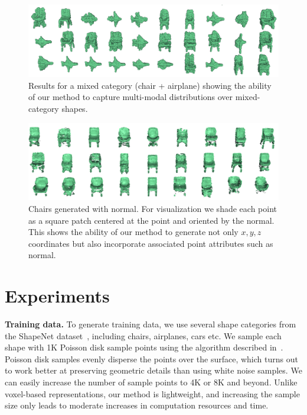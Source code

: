 \begin{figure}[t]
\includegraphics[width=1.0\linewidth]{PCAGAN/images/gallery/chairs_airplane.png}
\vspace{-16pt}
\caption{\small \label{fig:mixed} Results for a mixed category (chair + airplane) showing the ability of our method to capture multi-modal distributions over mixed-category shapes.}
\vspace{-6pt}
\end{figure}

\begin{figure}[t]
\includegraphics[width=1.0\linewidth]{PCAGAN/images/gallery/chairs_normals.png}
\vspace{-16pt}
\caption{\small \label{fig:normals} Chairs generated with normal. For visualization we shade each point as a square patch centered at the point and oriented by the normal. This shows the ability of our method to generate not only $x,y,z$ coordinates but also incorporate associated point attributes such as normal.}
\vspace{-12pt}
\end{figure}

\section{Experiments}\label{sec:experiments}

\noindent \textbf{Training data.} To generate training data, we use several shape categories from the ShapeNet dataset~\cite{chang2015shapenet}, including chairs, airplanes, cars etc. We sample each shape with 1K Poisson disk sample points using the algorithm described in~\cite{Bowers:2010:PPD}. Poisson disk samples evenly disperse the points over the surface, which turns out to work better at preserving geometric details than using white noise samples. We can easily increase the number of sample points to 4K or 8K and beyond. Unlike voxel-based representations, our method is lightweight, and increasing the sample size only leads to moderate increases in computation resources and time. 

